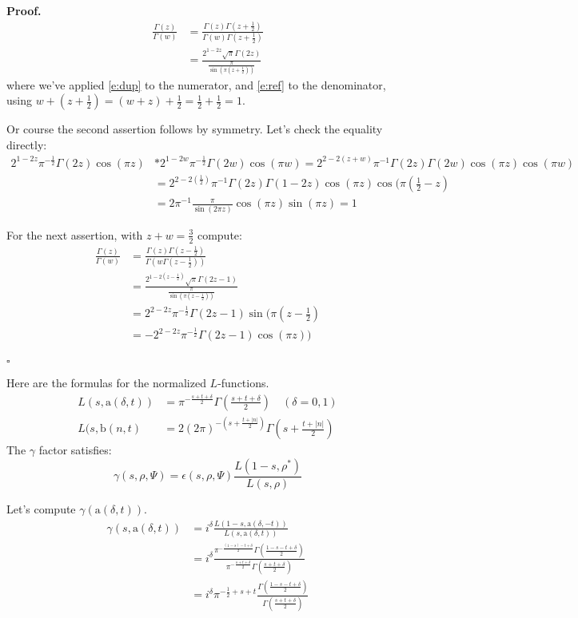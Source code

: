 \documentclass[10pt,leqno]{article}
\newcommand{\qed}{\hfill $\square$ \medskip}
\newenvironment{proof}[1][Proof]{\noindent\textbf{#1.} }{\qed}
\renewcommand{\b}{\mathfrak b}
\renewcommand{\a}{\mathfrak a}
\newcommand\inv{^{-1}}
\renewcommand{\a}{\mathrm a}
\renewcommand{\b}{\mathrm b}
\begin{document}
\begin{proof}
$$
\begin{aligned}
\frac{\Gamma(z)}{\Gamma(w)}&=
\frac{\Gamma(z)\Gamma(z+\frac12)}{\Gamma(w)\Gamma(z+\frac12)}\\
&=
\frac{2^{1-2z}\sqrt\pi\Gamma(2z)}
{\frac\pi{\sin(\pi(z+\frac12))}}
\end{aligned}
$$
where we've applied  \eqref{e:dup} to the numerator, and \eqref{e:ref} to the denominator, using $w+(z+\frac12)=(w+z)+\frac12=\frac12+\frac12=1$.

Or course the second assertion follows by symmetry. Let's check the equality directly:
$$
\begin{aligned}
2^{1-2z}\pi^{-\frac12}\Gamma(2z)\cos(\pi z)&*2^{1-2w}\pi^{-\frac12}\Gamma(2w)\cos(\pi w)
=2^{2-2(z+w)}\pi\inv \Gamma(2z)\Gamma(2w)\cos(\pi z)\cos(\pi w)\\
&=
2^{2-2(\frac12)}\pi\inv \Gamma(2z)\Gamma(1-2z)\cos(\pi z)\cos(\pi(\frac12-z)\\
&=2\pi\inv \frac\pi{\sin(2\pi z)}\cos(\pi z)\sin(\pi z)=1
\end{aligned}
$$

For the next assertion, with $z+w=\frac 32$ compute:
$$
\begin{aligned}
  \frac{\Gamma(z)}{\Gamma(w)}&=
  \frac{\Gamma(z)\Gamma(z-\frac12)}{\Gamma(w\Gamma(z-\frac12))}\\
  &=
  \frac{2^{1-2(z-\frac12)}\sqrt\pi \Gamma(2z-1)}{\frac\pi{\sin(\pi(z-\frac12))}}
  \\
  &=2^{2-2z}\pi^{-\frac12}\Gamma(2z-1)\sin(\pi(z-\frac12)\\
    &=-2^{2-2z}\pi^{-\frac12}\Gamma(2z-1)\cos(\pi z))\\
\end{aligned}
$$

  \end{proof}







Here are the formulas for the normalized $L$-functions.
$$
\begin{aligned}
L(s,\a(\delta,t))&=\pi^{-\frac{s+t+\delta}2}\Gamma(\frac{s+t+\delta}2)\quad(\delta=0,1)\\
L(s,\b(n,t)&=2(2\pi)^{-(s+\frac{t+ |n|}2)}\Gamma(s+\frac{t+|n|}2)
\end{aligned}
$$
The $\gamma$ factor satisfies:
$$
\gamma(s,\rho,\Psi)=\epsilon(s,\rho,\Psi)\frac{L(1-s,\rho^*)}{L(s,\rho)}
$$

Let's compute $\gamma(\a(\delta,t))$.
\begin{equation}
\begin{aligned}
\gamma(s,\a(\delta,t))&=i^\delta\frac{L(1-s,\a(\delta,-t))}{L(s,\a(\delta,t))}\\
&=
i^\delta
\frac{\pi^{-\frac{(1-s)-t+\delta}2}\Gamma(\frac{1-s-t+\delta}2)}
{\pi^{-\frac{s+t+\delta}2}\Gamma(\frac{s+t+\delta}2)}\\
&=i^\delta
\pi^{-\frac 12+s+t}\frac{\Gamma(\frac{1-s-t+\delta}2)}{\Gamma(\frac{s+t+\delta}2)}
\end{aligned}
\end{equation}
\end{document}
